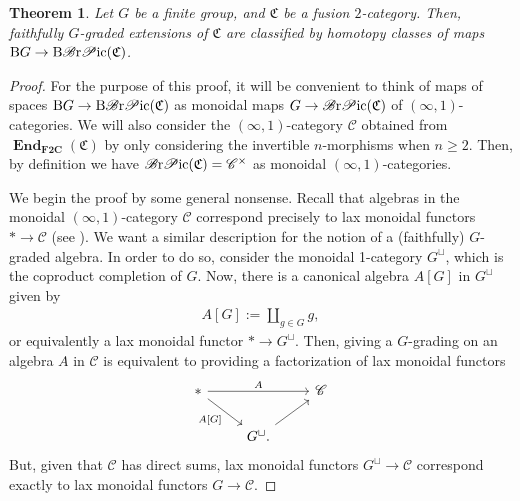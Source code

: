 \documentclass[10pt,a4paper]{amsart}
\newtheorem{Theorem}{Theorem}[section]
\numberwithin{equation}{section}
\begin{document}
\begin{Theorem}\label{thm:extensiontheory}
Let $G$ be a finite group, and $\mathfrak{C}$ be a fusion $2$-category. Then, faithfully $G$-graded extensions of $\mathfrak{C}$ are classified by homotopy classes of maps $\mathrm{B}G\rightarrow \mathrm{B}\mathscr{B}{\rm r}\mathscr{P}{\rm ic}(\mathfrak{C})$.
\end{Theorem}
\begin{proof}
For the purpose of this proof, it will be convenient to think of maps of spaces $\mathrm{B}G\rightarrow \mathrm{B}\mathscr{B}{\rm r}\mathscr{P}{\rm ic}(\mathfrak{C})$ as monoidal maps $G\rightarrow \mathscr{B}{\rm r}\mathscr{P}{\rm ic}(\mathfrak{C})$ of $(\infty,1)$-categories. We will also consider the $(\infty,1)$-category $\mathscr{C}$ obtained from $\mathbf{\operatorname{End}}_{\mathbf{F2C}}(\mathfrak{C})$ by only considering the invertible $n$-morphisms when $n\geq 2$. Then, by definition we have $\mathscr{B}{\rm r}\mathscr{P}{\rm ic}(\mathfrak{C})=\mathscr{C}^{\times}$ as monoidal $(\infty,1)$-categories.

We begin the proof by some general nonsense. Recall that algebras in the monoidal $(\infty,1)$-category $\mathscr{C}$ correspond precisely to lax monoidal functors $*\rightarrow \mathscr{C}$ (see \cite[Example~2.2.6.10]{L2}). We want a similar description for the notion of a (faithfully) $G$-graded algebra. In order to do so, consider the monoidal 1-category $G^{\sqcup}$, which is the coproduct completion of $G$. Now, there is a canonical algebra $A[G]$ in $G^{\sqcup}$ given by
 \begin{gather*}
A[G]:=\coprod_{g\in G}g,
\end{gather*}
 or equivalently a lax monoidal functor $*\rightarrow G^{\sqcup}$. Then, giving a $G$-grading on an algebra $A$ in $\mathscr{C}$ is equivalent to providing a factorization of lax monoidal functors
\begin{displaymath}
\begin{tikzcd}
* \arrow[rr,"A"] \arrow[rd, "A\lbrack G \rbrack"'] & & \mathscr{C} \\
 & G^{\sqcup}. \arrow[ru] &
\end{tikzcd}\end{displaymath}
But, given that $\mathscr{C}$ has direct sums, lax monoidal functors $G^{\sqcup}\rightarrow \mathscr{C}$ correspond exactly to lax monoidal functors $G\rightarrow \mathscr{C}$.


\end{proof}
\end{document}
